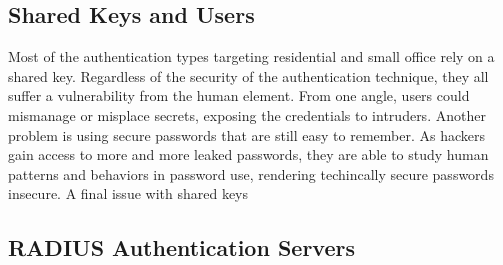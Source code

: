 \subsection{Shared Keys and Users}
Most of the authentication types targeting residential and small office rely on a shared key.
Regardless of the security of the authentication technique, they all suffer a vulnerability from
the human element. From one angle, users could mismanage or misplace secrets, exposing the
credentials to intruders. Another problem is using secure passwords that are still easy to
remember. As hackers gain access to more and more leaked passwords, they are able to study human
patterns and behaviors in password use, rendering techincally secure passwords insecure.
\cite{wired:Passwords} A final issue with shared keys

\subsection{RADIUS Authentication Servers}

